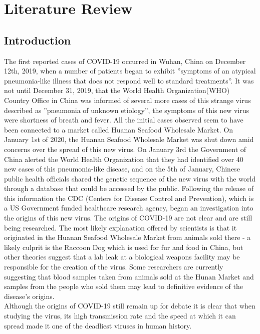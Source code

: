 \chapter{Literature Review}
\section{Introduction}
The first reported cases of COVID-19 occurred in Wuhan, China on December 12th, 2019\cite{CDCCovidTimeline}, when a number of patients began to exhibit ''symptoms of an atypical pneumonia-like illness that does not respond well to standard treatments''.  It was not until December 31, 2019, that the World Health Organization(WHO) Country Office in China was informed of several more cases of this strange virus described as ''pneumonia of unknown etiology'', the symptoms of this new virus were shortness of breath and fever.  All the initial cases observed seem to have been connected to a market called Huanan Seafood Wholesale Market.  On January 1st of 2020, the Huanan Seafood Wholesale Market was shut down amid concerns over the spread of this new virus.  On January 3rd the Government of China alerted the World Health Organization that they had identified over 40 new cases of this pneumonia-like disease, and on the 5th of January, Chinese public health officials shared the genetic sequence of the new virus with the world through a database that could be accessed by the public.  Following the release of this information the CDC (Centers for Disease Control and Prevention), which is a US Government funded healthcare research agency, began an investigation into the origins of this new virus.  The origins of COVID-19 are not clear and are still being researched.  The most likely explanation offered by scientists is that it originated in the Huanan Seafood Wholesale Market from animals sold there - a likely culprit is the Raccoon Dog which is used for fur and food in China\cite{CovidOriginsMarket}, but other theories suggest that a lab leak at a biological weapons facility\cite{CovidOriginsLab} may be responsible for the creation of the virus.  Some researchers are currently suggesting that blood samples taken from animals sold at the Hunan Market and samples from the people who sold them may lead to definitive evidence of the disease's origins\cite{CovidOriginsMarket}.
\\
Although the origins of COVID-19 still remain up for debate it is clear that when studying the virus, its high transmission rate and the speed at which it can spread made it one of the deadliest viruses in human history.\cite{smithsonianCovid191918Flu}\cite{nationalGeographicCovid191918Flu}
